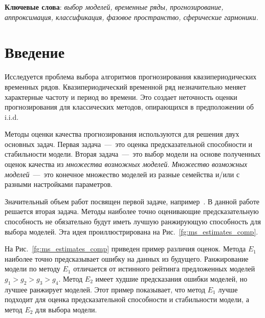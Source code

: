 \documentclass[article,14pt,subf,href,colorlinks=true
]{disser}
\begin{document}
\textbf{Ключевые слова}: \emph {выбор моделей, временные ряды, прогнозирование, аппроксимация, классификация, фазовое пространство, сферические гармоники.}

\newpage

\section*{\centering Введение}

Исследуется проблема выбора алгоритмов прогнозирования квазипериодических временных рядов.
Квазипериодический временной ряд незначительно меняет характерные частоту и период во времени. 
Это создает неточность оценки прогнозирования для классических методов, опирающихся в предположении об i.i.d.

Методы оценки качества прогнозирования используются для решения двух основных задач.
Первая задача~---~это оценка предсказательной способности и стабильности модели.
Вторая задача~---~это выбор модели на основе полученных оценок качества из \emph{множества возможных моделей}.
\emph{Множество возможных моделей}~---~это конечное множество моделей из разные семейства и/или с разными настройками параметров.

Значительный объем работ посвящен первой задаче, например~\cite{Christoph_2012,Christoph_2018, Cerqueira_2021}.
В данной работе решается вторая задача.
Методы наиболее точно оценивающие предсказательную способность не обязательно будут иметь лучшую ранжирующую способность для выбора моделей.
Эта идея проиллюстрирована на Рис.~\ref{fg:ms_estimates_comp}.

На Рис.~\ref{fg:ms_estimates_comp} приведен пример различия оценок.
Метода $E_1$ наиболее точно предсказывает ошибку на данных из будущего. Ранжирование модели по методу $E_1$ отличается от истинного рейтинга предложенных моделей  $g_1>g_2>g_3>g_4$.
Метод $E_2$ имеет худшие предсказания ошибки моделей, но лучшее ранжирует моделей.
Этот пример показывает, что метод $E_1$ лучше подходит для оценка предсказательной способности и стабильности модели, а метод $E_2$ для выбора модели.
\end{document}
